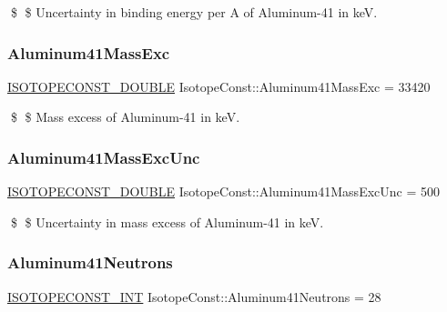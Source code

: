 \$ \$ Uncertainty in binding energy per A of Aluminum-\/41 in keV. \mbox{\label{group___isotope_const-_aluminum-_al41_ga6c3f99fed0672274d19dc940fe85ad2f}} 
\subsubsection{\texorpdfstring{Aluminum41\+Mass\+Exc}{Aluminum41MassExc}}
{\footnotesize\ttfamily \mbox{\hyperlink{group___isotope_const-_macros_ga8f45a7272ce02c0b4c65c44636ed719a}{I\+S\+O\+T\+O\+P\+E\+C\+O\+N\+S\+T\+\_\+\+D\+O\+U\+B\+LE}} Isotope\+Const\+::\+Aluminum41\+Mass\+Exc = 33420}

\$ \$ Mass excess of Aluminum-\/41 in keV. \mbox{\label{group___isotope_const-_aluminum-_al41_gaf2ec6a521faf350be0e7854507db1dcb}} 
\subsubsection{\texorpdfstring{Aluminum41\+Mass\+Exc\+Unc}{Aluminum41MassExcUnc}}
{\footnotesize\ttfamily \mbox{\hyperlink{group___isotope_const-_macros_ga8f45a7272ce02c0b4c65c44636ed719a}{I\+S\+O\+T\+O\+P\+E\+C\+O\+N\+S\+T\+\_\+\+D\+O\+U\+B\+LE}} Isotope\+Const\+::\+Aluminum41\+Mass\+Exc\+Unc = 500}

\$ \$ Uncertainty in mass excess of Aluminum-\/41 in keV. \mbox{\label{group___isotope_const-_aluminum-_al41_ga41e59708e473244558deaa37a7d57038}} 
\subsubsection{\texorpdfstring{Aluminum41\+Neutrons}{Aluminum41Neutrons}}
{\footnotesize\ttfamily \mbox{\hyperlink{group___isotope_const-_macros_ga5f18360b3e99483a35c32d789e62621c}{I\+S\+O\+T\+O\+P\+E\+C\+O\+N\+S\+T\+\_\+\+I\+NT}} Isotope\+Const\+::\+Aluminum41\+Neutrons = 28}

